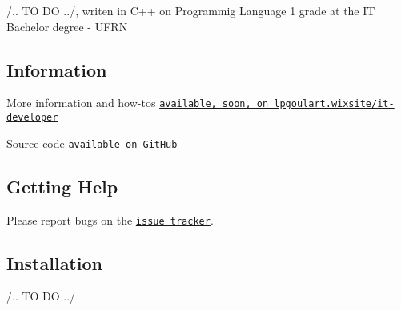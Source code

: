 /.. TO DO ../, writen in C++ on Programmig Language 1 grade at the IT Bachelor degree -\/ U\+F\+RN

\subsection*{Information}


\begin{DoxyItemize}
\item More information and how-\/tos \href{https://lpgoulart.wixsite.com/it-developer}{\tt available, soon, on lpgoulart.\+wixsite/it-\/developer}
\item Source code \href{https://github.com/lpgoulart/Library}{\tt available on Git\+Hub}
\end{DoxyItemize}

\subsection*{Getting Help}


\begin{DoxyItemize}
\item Please report bugs on the \href{https://github.com/lpgoulart/Library/issues}{\tt issue tracker}.
\end{DoxyItemize}

\subsection*{Installation}

/.. TO DO ../ 